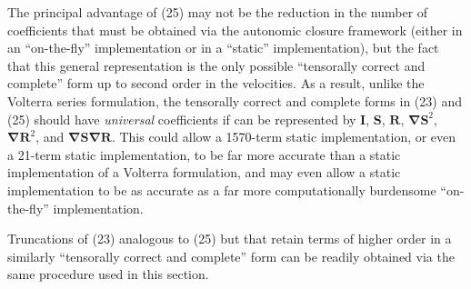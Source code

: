 The principal advantage of (25) may not be the reduction in the number of coefficients that must be obtained via the autonomic closure framework (either in an ``on-the-fly'' implementation or in a ``static'' implementation), but the fact that this general representation is the only possible ``tensorally correct and complete'' form up to second order in the velocities. As a result, unlike the Volterra series formulation, the tensorally correct and complete forms in (23) and (25) should have \textit{universal} coefficients   if   can be represented by $\mathbf{I}$, $\mathbf{S}$, $\mathbf{R}$, $\mathbf{\nabla S}^{2}$, $\mathbf{\nabla R}^{2}$, and $\mathbf{\nabla S \nabla R}$. This could allow a 1570-term static implementation, or even a 21-term static implementation, to be far more accurate than a static implementation of a Volterra formulation, and may even allow a static implementation to be as accurate as a far more computationally burdensome ``on-the-fly'' implementation.   

Truncations of (23) analogous to (25) but that retain terms of higher order in a similarly  ``tensorally correct and complete'' form can be readily obtained via the same procedure used in this section. 




